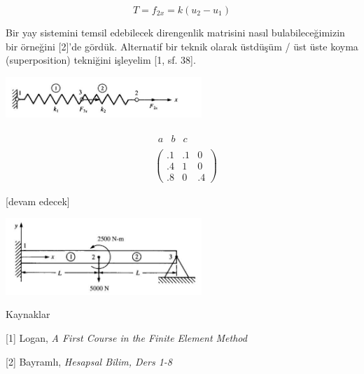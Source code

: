 \documentclass[12pt,fleqn]{article}\usepackage{../../common}
\begin{document}
$$
T = f_{2x} = k (u_2 - u_1)
$$


Bir yay sistemini temsil edebilecek direngenlik matrisini nasıl
bulabileceğimizin bir örneğini [2]'de gördük. Alternatif bir
teknik olarak üstdüşüm / üst üste koyma (superposition) tekniğini
işleyelim [1, sf. 38]. 

\includegraphics[width=20em]{phy_020_strs_06_02.jpg}


$$
\begin{array}{cc} & \begin{array}{ccc} a & b & c \end{array} \\ &
\left(
\begin{array}{ccc}
.1 & .1 & 0 \\
.4 & 1 & 0 \\
.8 & 0 & .4
\end{array}
\right)
\end{array}
$$





[devam edecek]


\includegraphics[width=20em]{phy_020_strs_06_01.jpg}


Kaynaklar

[1] Logan, {\em A First Course in the Finite Element Method}

[2] Bayramlı, {\em Hesapsal Bilim, Ders 1-8}
\end{document}
